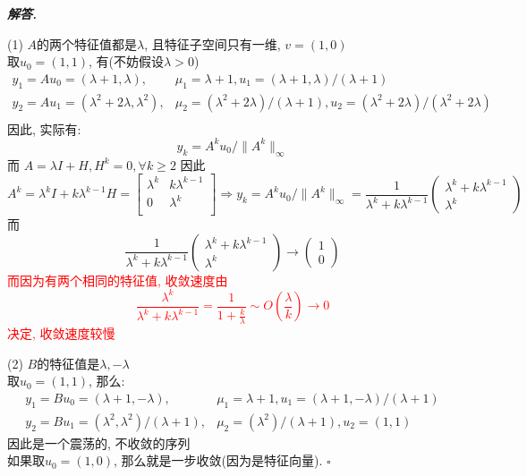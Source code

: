 \documentclass[10pt, a4paper, oneside]{ctexart}
\newcommand{\norm}[1]{\| #1 \|}
\newenvironment{solution}{%
  \par\noindent\textbf{\textit{解答. }}\ignorespaces
}{%
  \hfill\ensuremath{\square}\par %
}
\begin{document}
    \begin{solution}
    (1) $A$的两个特征值都是$\lambda$, 且特征子空间只有一维, $v=(1,0)$\\
    取$u_0=(1,1)$, 有(不妨假设$\lambda>0$) 
    \begin{align*}
        y_1=Au_0=(\lambda+1,\lambda),& \mu_1=\lambda+1, u_1=(\lambda+1,\lambda)/(\lambda+1)\\
        y_2=Au_1=(\lambda^2+2\lambda,\lambda^2),& \mu_2=(\lambda^2+2\lambda)/(\lambda+1), u_2=(\lambda^2+2\lambda)/(\lambda^2+2\lambda)\\
    \end{align*}
    因此, 实际有: 
    $$y_k=A^ku_0/\norm{A^k}_{\infty}$$
    而 
    $A=\lambda I +H, H^k=0, \forall k\geq 2$
    因此 
    $$A^k=\lambda^k I +k\lambda^{k-1}H=\begin{bmatrix}
        \lambda^k&k\lambda^{k-1}\\
        0&\lambda^{k}\\
    \end{bmatrix}\Rightarrow y_k=A^ku_0/\norm{A^k}_{\infty}=\frac{1}{\lambda^k+k\lambda^{k-1}}\begin{pmatrix}
        \lambda^k+k\lambda^{k-1}\\
        \lambda^k
    \end{pmatrix}$$
    而 
    $$\frac{1}{\lambda^k+k\lambda^{k-1}}\begin{pmatrix}
        \lambda^k+k\lambda^{k-1}\\
        \lambda^k
    \end{pmatrix}\to \begin{pmatrix}
        1\\0
    \end{pmatrix}$$
    \textcolor{red}{而因为有两个相同的特征值, 收敛速度由
    $$\frac{\lambda^k}{\lambda^k+k\lambda^{k-1}}=\frac{1}{1+\frac{k}{\lambda}}\sim O(\frac{\lambda}{k})\to 0$$
    决定, 收敛速度较慢}
    
    (2) $B$的特征值是$\lambda, -\lambda$\\
    取$u_0=(1,1)$, 那么:
    \begin{align*}
        y_1=Bu_0=(\lambda+1,-\lambda), &\mu_1=\lambda+1, u_1=(\lambda+1,-\lambda)/(\lambda+1)\\
        y_2=Bu_1=(\lambda^2,\lambda^2)/(\lambda+1), &\mu_2=(\lambda^2)/(\lambda+1), u_2=(1,1)
    \end{align*}
    因此是一个震荡的, 不收敛的序列\\
    如果取$u_0=(1,0)$, 那么就是一步收敛(因为是特征向量).
    \end{solution}
    
\end{document}
